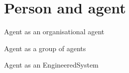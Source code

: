 \chapter{Person and agent}

Agent as an organisational agent

Agent as a group of agents 

Agent as an EngineeredSystem